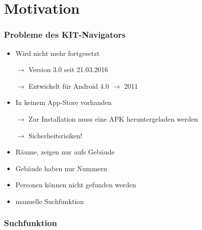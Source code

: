 \section{Motivation}

\begin{frame}\frametitle{Probleme des KIT-Navigators}
    \begin{minipage}{\textwidth}
        \begin{minipage}{.49\textwidth}
            \begin{itemize}
                \item Wird nicht mehr fortgesetzt
                \item[$\rightarrow$] Version 3.0 seit 21.03.2016
                \item[$\rightarrow$] Entwickelt für Android 4.0 $\rightarrow$ 2011
                \item In keinem App-Store vorhanden
                \item[$\rightarrow$] Zur Installation muss eine APK heruntergeladen werden
                \item[$\rightarrow$] Sicherheitsrisiken!
                \item Räume, zeigen nur aufs Gebäude
                \item Gebäude haben nur Nummern
                \item Personen können nicht gefunden werden
                \item manuelle Suchfunktion
            \end{itemize}
        \end{minipage}
        \begin{minipage}{.49\textwidth}
            \centering
        \end{minipage}
    \end{minipage}
\end{frame}

\begin{frame}\frametitle{Suchfunktion}
    \begin{minipage}{\textwidth}
        \begin{minipage}{.49\textwidth}
            \centering
        \end{minipage}
        \begin{minipage}{.49\textwidth}
            \centering
        \end{minipage}
    \end{minipage}
\end{frame}

